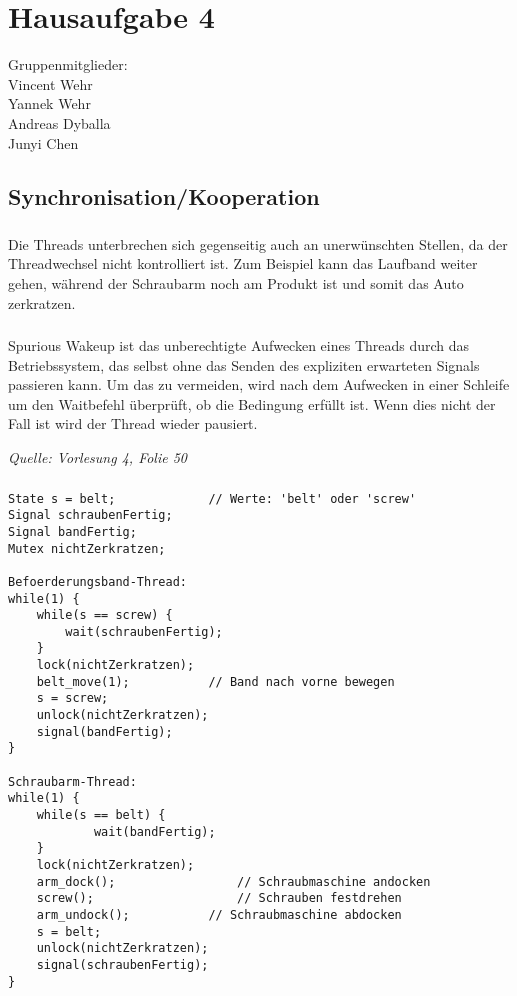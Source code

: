 \documentclass[a4paper]{article}
\newenvironment{quelle}{\medskip \noindent\itshape Quelle: }{\medskip}
\newcommand{\hausaufgabenNr}{4}
\begin{document}
\setcounter{section}{\hausaufgabenNr}
\setcounter{subsection}{3}
\section*{Hausaufgabe \hausaufgabenNr}
Gruppenmitglieder:\\
Vincent Wehr\\
Yannek Wehr\\
Andreas Dyballa\\
Junyi Chen
\subsection{Synchronisation/Kooperation}
\subsubsection{}
Die Threads unterbrechen sich gegenseitig auch an unerwünschten Stellen, da der Threadwechsel 
nicht kontrolliert ist. Zum Beispiel kann das Laufband weiter gehen, während der Schraubarm noch am 
Produkt ist und somit das Auto zerkratzen.

\subsubsection{}
Spurious Wakeup ist das unberechtigte Aufwecken eines Threads durch das Betriebssystem, das 
selbst ohne das Senden des expliziten erwarteten Signals passieren kann. Um das zu vermeiden, wird 
nach dem Aufwecken in einer Schleife um den Waitbefehl überprüft, ob die Bedingung erfüllt ist. 
Wenn dies nicht der Fall ist wird der Thread wieder pausiert.

\begin{quelle}
  Vorlesung 4, Folie 50
\end{quelle}

\subsubsection{}
\begin{lstlisting}
State s = belt; 			// Werte: 'belt' oder 'screw'
Signal schraubenFertig;
Signal bandFertig;
Mutex nichtZerkratzen;

Befoerderungsband-Thread: 
while(1) { 
	while(s == screw) {
		wait(schraubenFertig);
	}
  	lock(nichtZerkratzen);
	belt_move(1);     		// Band nach vorne bewegen
	s = screw;
	unlock(nichtZerkratzen);
	signal(bandFertig);
}

Schraubarm-Thread: 
while(1) { 
	while(s == belt) {
    		wait(bandFertig);
	}
	lock(nichtZerkratzen);
	arm_dock();         		// Schraubmaschine andocken 
	screw();                	// Schrauben festdrehen
	arm_undock();   		// Schraubmaschine abdocken
	s = belt;
	unlock(nichtZerkratzen);
	signal(schraubenFertig);
}
\end{lstlisting}
\newpage
\end{document}
